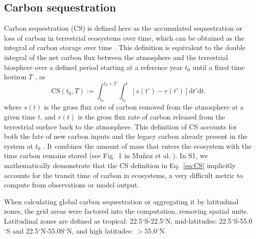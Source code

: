 \documentclass[9pt,twocolumn,twoside]{pnas-new}
\begin{document}
{\subsection*{Carbon sequestration} 
Carbon sequestration (CS) is defined here as the accumulated sequestration or loss of carbon in terrestrial ecosystems over time, which can be obtained as the integral of carbon storage over time \cite{Sierra2021}. This definition is equivalent to the double integral of the net carbon flux between the atmosphere and the terrestrial biosphere over a defined period starting at a reference year $t_0$ until a fixed time horizon $T$ \citep{Sierra2021,Metzler2024,Sierra2025}, as
\begin{equation} \label{eq:CS}
    \mbox{CS}\left(t_0,T\right):=\int^{t_0+T}_{t_0} \int^{t}_{t_0} \left[s(t')-r(t')\right]\mathrm{d}t'\mathrm{d}t.
\end{equation}
where $s(t)$ is the gross flux rate of carbon removed from the atmosphere at a given time $t$, and $r(t)$ is the gross flux rate of carbon released from the terrestrial surface back to the atmosphere. This definition of CS accounts for both the fate of new carbon inputs and the legacy carbon already present in the system at $t_0$ \citep{Metzler2024}. It combines the amount of mass that enters the ecosystem with the time carbon remains stored (see Fig.~1 in Muñoz et al. \citep{Munoz2024}). In S1, we mathematically demonstrate that the CS definition in Eq.~\ref{eq:CS} implicitly accounts for the transit time of carbon in ecosystems, a very difficult metric to compute from observations or model output.

When calculating global carbon sequestration or aggregating it by latitudinal zones, the grid areas were factored into the computation, removing spatial units. Latitudinal zones are defined as tropical: 22.5$^\circ$S-22.5$^\circ$N, mid-latitudes: 22.5$^\circ$S-55.0$^\circ$S and 22.5$^\circ$N-55.0S$^\circ$N, and high latitudes: $>$55.0$^\circ$N.
}
\showmatmethods{} %
\end{document}
